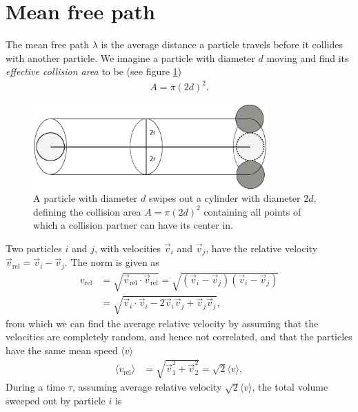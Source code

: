 \section{Mean free path}
\label{sec:mean_free_path_calculation}
The mean free path $\lambda$ is the average distance a particle travels before it collides with another particle. We imagine a particle with diameter $d$ moving and find its \textit{effective collision area} to be (see figure \ref{fig:effective_collision_area})
\begin{align}
	A = \pi (2d)^2.
\end{align}
\begin{figure}[h]
\begin{center}
\includegraphics[width=0.8\textwidth, trim=0cm 0cm 0cm 0cm, clip]{DSMC/figures/effective_area2.eps}
\end{center}
\caption{A particle with diameter $d$ swipes out a cylinder with diameter $2d$, defining the collision area $A=\pi (2d)^2$ containing all points of which a collision partner can have its center in.}
\label{fig:effective_collision_area}
\end{figure}
Two particles $i$ and $j$, with velocities $\vec v_i$ and $\vec v_j$, have the relative velocity $\vec v_\text{rel} = \vec v_i - \vec v_j$. The norm is given as
\begin{align}
	v_\text{rel} &= \sqrt{\vec v_\text{rel}\cdot \vec v_\text{rel} } = \sqrt{ (\vec v_i - \vec v_j)(\vec v_i - \vec v_j)}\\
	&= \sqrt{\vec v_i\cdot \vec v_i - 2\vec v_i\vec v_j + \vec v_j\vec v_j},
\end{align}
from which we can find the average relative velocity by assuming that the velocities are completely random, and hence not correlated, and that the particles have the same mean speed $\langle v\rangle$
\begin{align}
	\langle v_\text{rel}\rangle &= \sqrt{\vec v_1^2 + \vec v_2^2} = \sqrt 2 \langle v\rangle,
\end{align}
During a time $\tau$, assuming average relative velocity $\sqrt 2 \langle v\rangle$, the total volume sweeped out by particle $i$ is 
